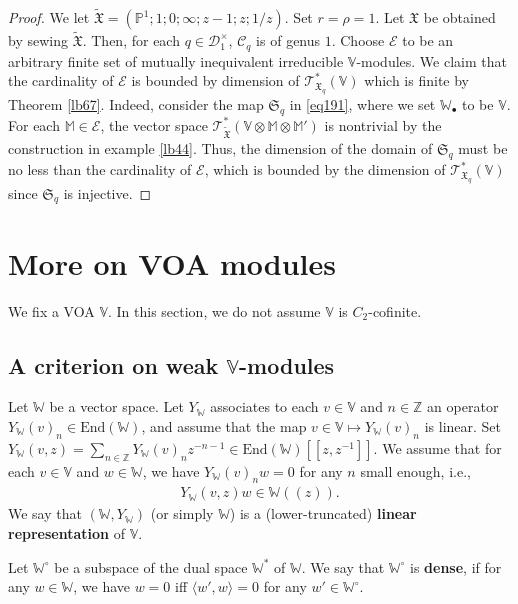 \documentclass[12pt,a4paper,notitlepage]{report}
\theoremstyle{definition}
\theoremstyle{plain}
\newcommand{\fk}{\mathfrak}
\newcommand{\mc}{\mathcal}
\newcommand{\wtd}{\widetilde}
\newcommand{\End}{\mathrm{End}} %
\newcommand{\bk}[1]{\langle {#1}\rangle}
\newcommand{\scr}{\mathscr}
\newcommand{\blt}{\bullet}
\newcommand{\Vbb}{\mathbb V}
\newcommand{\Wbb}{\mathbb W}
\newcommand{\Mbb}{\mathbb M}
\newcommand{\Zbb}{\mathbb Z}
\newcommand{\Pbb}{\mathbb P}
\numberwithin{equation}{section}
\begin{document}
\begin{proof}
We let $\wtd{\fk X}=(\Pbb^1;1;0;\infty;z-1;z;1/z)$. Set $r=\rho=1$. Let $\fk X$ be obtained by sewing $\wtd{\fk X}$. Then, for each $q\in\mc D_1^\times$, $\mc C_q$ is of genus $1$. Choose $\mc E$ to be an arbitrary finite set of mutually inequivalent irreducible $\Vbb$-modules. We claim that the cardinality of $\mc E$ is bounded by dimension of $\scr T_{\fk X_q}^*(\Vbb)$ which is finite by Theorem \ref{lb67}. Indeed, consider the map $\fk S_q$ in \eqref{eq191}, where we set $\Wbb_\blt$ to be $\Vbb$. For each $\Mbb\in\mc E$, the vector space $\scr T_{\wtd {\fk X}}^*(\Vbb\otimes\Mbb\otimes\Mbb')$ is nontrivial by the construction in example \ref{lb44}. Thus, the dimension of the domain of $\fk S_q$ must be no less than the cardinality of $\mc E$, which is bounded by the dimension of $\scr T_{\fk X_q}^*(\Vbb)$ since $\fk S_q$ is injective.
\end{proof}





\section{More on VOA modules}

We fix a  VOA $\Vbb$. In this section, we do not assume $\Vbb$ is $C_2$-cofinite.

\subsection*{A criterion on weak $\Vbb$-modules}



Let $\Wbb$ be a vector space. Let $Y_\Wbb$ associates to each $v\in\Vbb$ and $n\in\Zbb$ an operator $Y_\Wbb(v)_n\in\End(\Wbb)$, and assume that the map $v\in\Vbb\mapsto Y_\Wbb(v)_n$ is linear. Set $Y_\Wbb(v,z)=\sum_{n\in\Zbb}Y_\Wbb(v)_nz^{-n-1}\in \End(\Wbb)[[z,z^{-1}]]$. We assume that for each $v\in\Vbb$ and $w\in\Wbb$, we have $Y_\Wbb(v)_nw=0$ for any $n$ small enough, i.e.,
\begin{align*}
Y_\Wbb(v,z)w\in\Wbb((z)).
\end{align*}
We say that $(\Wbb,Y_\Wbb)$ (or simply $\Wbb$) is a (lower-truncated) \textbf{linear representation} of $\Vbb$. 

Let $\Wbb^\circ$ be a subspace of the dual space $\Wbb^*$ of $\Wbb$. We say that $\Wbb^\circ$ is \textbf{dense}, if for any $w\in\Wbb$, we have $w=0$ iff $\bk{w',w}=0$ for any $w'\in\Wbb^\circ$. 
\end{document}
